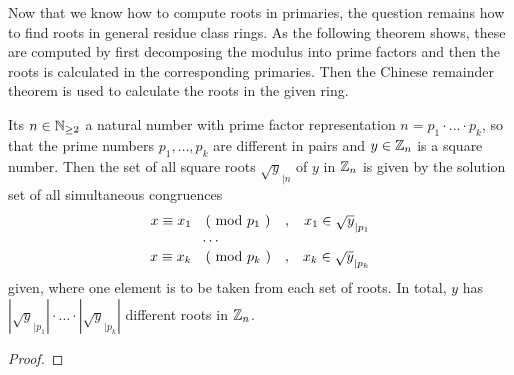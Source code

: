 Now that we know how to compute roots in primaries, the question remains how to find roots in general residue class rings. As the following theorem shows, these are computed by first decomposing the modulus into prime factors and then the roots is calculated in the corresponding primaries. Then the Chinese remainder theorem is used to calculate the roots in the given ring.
\begin{theorem}
\label{theorem: square_root_construction}
Its $ n \in \mathbb{N} _{\geq 2} $ a natural number
with prime factor representation $ n = p_1 \cdot \ldots \cdot p_k $, so that the prime numbers $ p_1, \ldots, p_k $ are different in pairs and $ y \in \mathbb{Z}_n $ is a square number. Then the set of all square roots $ \sqrt{y} _{| n} $ of $ y $ in $ \mathbb{Z}_n $ is given by the solution set of all simultaneous congruences
\begin{equation}
\begin{array}{ccr}
x \equiv x_1 \quad \text{( mod } p_1 \text{ )} &, & x_1 \in \sqrt{y} _{| p_1} \\
\cdots \\
x \equiv x_k \quad \text{( mod } p_k \text{ )} &, & x_k \in \sqrt{y} _{| p_k} \\
\end{array}
\end{equation}
given, where one element is to be taken from each set of roots. In total, $ y $ has $ | \sqrt{y} _{| p_1} | \cdot \ldots \cdot | \sqrt{y} _{| p_k} | $ different roots in $ \mathbb{Z}_n $.
\end{theorem}
\begin{proof}
\end{proof}
